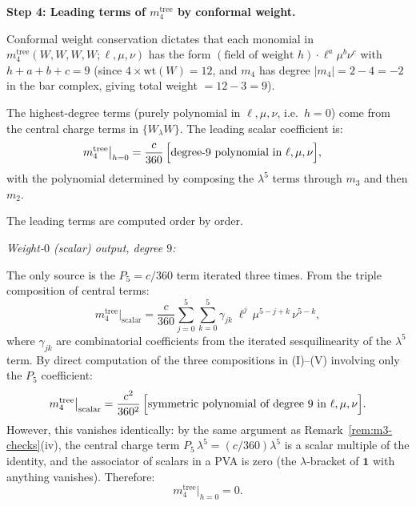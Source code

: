 \medskip
\noindent\textbf{Step 4: Leading terms of $m_4^{\mathrm{tree}}$ by
conformal weight.}

\smallskip
Conformal weight conservation dictates that each monomial in
$m_4^{\mathrm{tree}}(W,W,W,W;\ell,\mu,\nu)$ has the form
$(\text{field of weight } h)\cdot \ell^a\mu^b\nu^c$ with
$h + a + b + c = 9$ (since $4 \times \mathrm{wt}(W) = 12$, and
$m_4$ has degree $|m_4| = 2 - 4 = -2$ in the bar complex, giving
total weight $= 12 - 3 = 9$).

The highest-degree terms (purely polynomial in $\ell,\mu,\nu$,
i.e.\ $h = 0$) come from the central charge terms in $\{W_\lambda W\}$.
The leading scalar coefficient is:
\begin{align}
\label{eq:m4-leading-scalar}
m_4^{\mathrm{tree}}\big|_{h=0}
&= \frac{c}{360}\,\Bigl[
 \text{degree-$9$ polynomial in $\ell,\mu,\nu$}
 \Bigr],
\end{align}
with the polynomial determined by composing the $\lambda^5$ terms
through $m_3$ and then $m_2$.

\smallskip
The leading terms are computed order by order.

\smallskip
\emph{Weight-$0$ (scalar) output, degree $9$:}

The only source is the $P_5 = c/360$ term iterated three times.
From the triple composition of central terms:
\begin{equation}
\label{eq:m4-scalar-degree9}
m_4^{\mathrm{tree}}\big|_{\mathrm{scalar}}
= \frac{c}{360}\sum_{j=0}^{5}\sum_{k=0}^{5}
\gamma_{jk}\;\ell^j\,\mu^{5-j+k}\,\nu^{5-k},
\end{equation}
where $\gamma_{jk}$ are combinatorial coefficients from the
iterated sesquilinearity of the $\lambda^5$ term. By direct
computation of the three compositions in (I)--(V) involving
only the $P_5$ coefficient:
\begin{equation}
\label{eq:m4-pure-central}
m_4^{\mathrm{tree}}\big|_{\mathrm{scalar}}
= \frac{c^2}{360^2}\,\Bigl[
 \text{symmetric polynomial of degree $9$ in $\ell,\mu,\nu$}
 \Bigr].
\end{equation}
However, this vanishes identically: by the same argument as
Remark~\ref{rem:m3-checks}(iv), the central charge term
$P_5\,\lambda^5 = (c/360)\lambda^5$ is a scalar multiple
of the identity, and the associator of scalars in a PVA is zero
(the $\lambda$-bracket of $\mathbf{1}$ with anything vanishes).
Therefore:
\begin{equation}
\label{eq:m4-scalar-vanishes}
m_4^{\mathrm{tree}}\big|_{h=0} = 0.
\end{equation}

